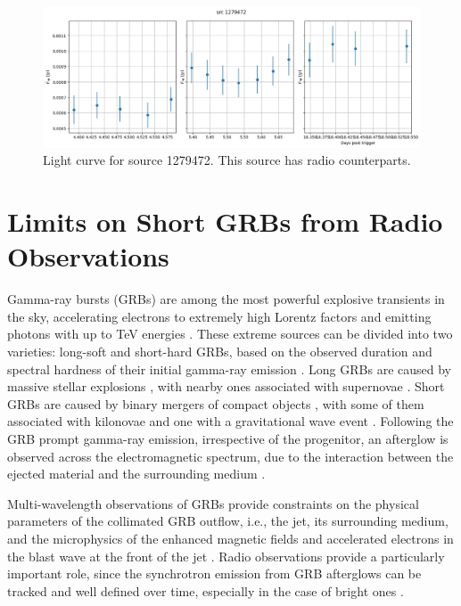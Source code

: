 \documentclass[12pt]{article}
\begin{document}
\begin{figure}
	\includegraphics[width=\textwidth]{src1279472multi.png}
	\caption{Light curve for source 1279472. This source has radio counterparts.}
	\label{fig:src1279472multi}
\end{figure}
\newpage
\section{Limits on Short GRBs from Radio Observations}

Gamma-ray bursts (GRBs) are among the most powerful explosive transients in the sky, accelerating electrons to extremely high Lorentz factors and emitting photons with up to TeV energies \citep[e.g.,][]{2019Natur.575..464A,2019Natur.575..459M}. These extreme sources can be divided into two varieties: long-soft and short-hard GRBs, based on the observed duration and spectral hardness of their initial gamma-ray emission \citep{1993ApJ...413L.101K}. Long GRBs are caused by massive stellar explosions \citep{1993ApJ...405..273W}, with nearby ones associated with supernovae \citep[e.g.,][]{2003Natur.423..847H}. Short GRBs are caused by binary mergers of compact objects \citep{1989Natur.340..126E}, with some of them associated with kilonovae \citep[e.g.,][]{2013Natur.500..547T} and one with a gravitational wave event \citep{2017ApJ...848L..12A}. Following the GRB prompt gamma-ray emission, irrespective of the progenitor, an afterglow is observed across the electromagnetic spectrum, due to the interaction between the ejected material and the surrounding medium \citep{1998ApJ...497L..17S,1999ApJ...523..177W,1999ApJ...520L..29C}.

Multi-wavelength observations of GRBs provide constraints on the physical parameters of the collimated GRB outflow, i.e., the jet, its surrounding medium, and the microphysics of the enhanced magnetic fields and accelerated electrons in the blast wave at the front of the jet \citep{1998ApJ...497L..17S}. Radio observations provide a particularly important role, since the synchrotron emission from GRB afterglows can be tracked and well defined over time, especially in the case of bright ones \citep[see, e.g.,][for a review]{2014PASA...31....8G}.
\end{document}
